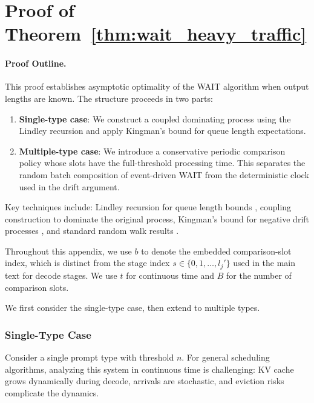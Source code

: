 
\section{Proof of Theorem~\ref{thm:wait_heavy_traffic}}\label{appexidx::proof of wait_heavy_traffic}

\paragraph{Proof Outline.}
This proof establishes asymptotic optimality of the WAIT algorithm when output lengths are known. The structure proceeds in two parts:
\begin{enumerate}
    \item \textbf{Single-type case}: We construct a coupled dominating process using the Lindley recursion and apply Kingman's bound for queue length expectations.
    \item \textbf{Multiple-type case}: We introduce a conservative periodic comparison policy whose slots have the full-threshold processing time. This separates the random batch composition of event-driven WAIT from the deterministic clock used in the drift argument.
\end{enumerate}
Key techniques include: Lindley recursion for queue length bounds \citep[Proposition 6.3]{asmussen2003applied}, coupling construction to dominate the original process, Kingman's bound for negative drift processes \citep{kingman1962queues}, and standard random walk results \citep{strait1974maximum}.

Throughout this appendix, we use $b$ to denote the embedded comparison-slot index, which is distinct from the stage index $s \in \{0, 1, \ldots, l_j'\}$ used in the main text for decode stages. We use $t$ for continuous time and \(B\) for the number of comparison slots.

We first consider the single-type case, then extend to multiple types.

\subsubsection{Single-Type Case}

Consider a single prompt type with threshold $n$. For general scheduling algorithms, analyzing this system in continuous time is challenging: KV cache grows dynamically during decode, arrivals are stochastic, and eviction risks complicate the dynamics.


